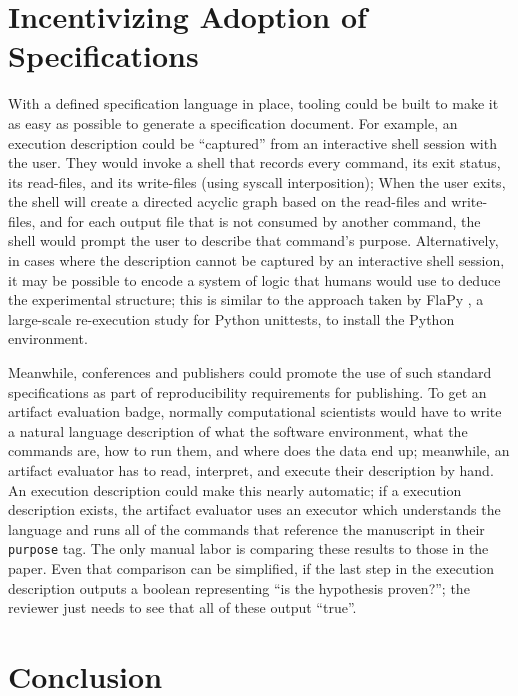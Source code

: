 \documentclass[manuscript,authordraft]{acmart}
\begin{document}
\hypertarget{incentivizing-adoption-of-specifications}{%
\section{Incentivizing Adoption of
Specifications}\label{incentivizing-adoption-of-specifications}}

With a defined specification language in place, tooling could be built
to make it as easy as possible to generate a specification document. For
example, an execution description could be ``captured'' from an
interactive shell session with the user. They would invoke a shell that
records every command, its exit status, its read-files, and its
write-files (using syscall interposition); When the user exits, the
shell will create a directed acyclic graph based on the read-files and
write-files, and for each output file that is not consumed by another
command, the shell would prompt the user to describe that command's
purpose. Alternatively, in cases where the description cannot be
captured by an interactive shell session, it may be possible to encode a
system of logic that humans would use to deduce the experimental
structure; this is similar to the approach taken by FlaPy
\cite{gruber_empirical_2021}, a large-scale re-execution study for
Python unittests, to install the Python environment.

Meanwhile, conferences and publishers could promote the use of such
standard specifications as part of reproducibility requirements for
publishing. To get an artifact evaluation badge, normally computational
scientists would have to write a natural language description of what
the software environment, what the commands are, how to run them, and
where does the data end up; meanwhile, an artifact evaluator has to
read, interpret, and execute their description by hand. An execution
description could make this nearly automatic; if a execution description
exists, the artifact evaluator uses an executor which understands the
language and runs all of the commands that reference the manuscript in
their \texttt{purpose} tag. The only manual labor is comparing these
results to those in the paper. Even that comparison can be simplified,
if the last step in the execution description outputs a boolean
representing ``is the hypothesis proven?''; the reviewer just needs to
see that all of these output ``true''.

\hypertarget{conclusion}{%
\section{Conclusion}\label{conclusion}}
\end{document}
